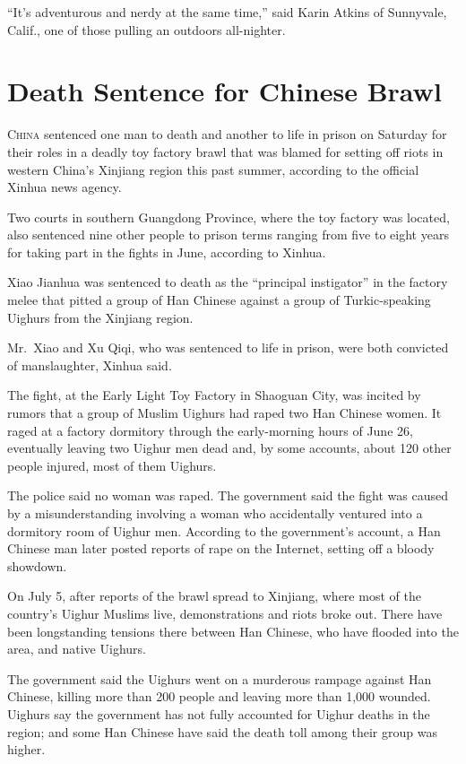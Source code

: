 ﻿\documentclass[12pt]{article}
\begin{document}
``It's adventurous and nerdy at the same time,'' said Karin Atkins of Sunnyvale, Calif., one of
those pulling an outdoors all-nighter.

\section{Death Sentence for Chinese Brawl}

\lettrine{C}{hina} sentenced one man to death and another to life in prison
on Saturday for their roles in a deadly toy factory brawl that was blamed for setting off riots in
western China's Xinjiang region this past summer, according to the official Xinhua news agency.

Two courts in southern Guangdong Province, where the toy factory was located, also sentenced nine
other people to prison terms ranging from five to eight years for taking part in the fights in June,
according to Xinhua.

Xiao Jianhua was sentenced to death as the ``principal instigator'' in the factory melee that pitted
a group of Han Chinese against a group of Turkic-speaking Uighurs from the Xinjiang region.

Mr.~Xiao and Xu Qiqi, who was sentenced to life in prison, were both convicted of manslaughter,
Xinhua said.

The fight, at the Early Light Toy Factory in Shaoguan City, was incited by rumors that a group of
Muslim Uighurs had raped two Han Chinese women. It raged at a factory dormitory through the
early-morning hours of June 26, eventually leaving two Uighur men dead and, by some accounts, about
120 other people injured, most of them Uighurs.

The police said no woman was raped. The government said the fight was caused by a misunderstanding
involving a woman who accidentally ventured into a dormitory room of Uighur men. According to the
government's account, a Han Chinese man later posted reports of rape on the Internet, setting off a
bloody showdown.

On July 5, after reports of the brawl spread to Xinjiang, where most of the country's Uighur Muslims
live, demonstrations and riots broke out. There have been longstanding tensions there between Han
Chinese, who have flooded into the area, and native Uighurs.

The government said the Uighurs went on a murderous rampage\cite{rampage} against Han Chinese,
killing more than 200 people and leaving more than 1,000 wounded. Uighurs say the government has not
fully accounted for Uighur deaths in the region; and some Han Chinese have said the death toll among
their group was higher.
\end{document}
